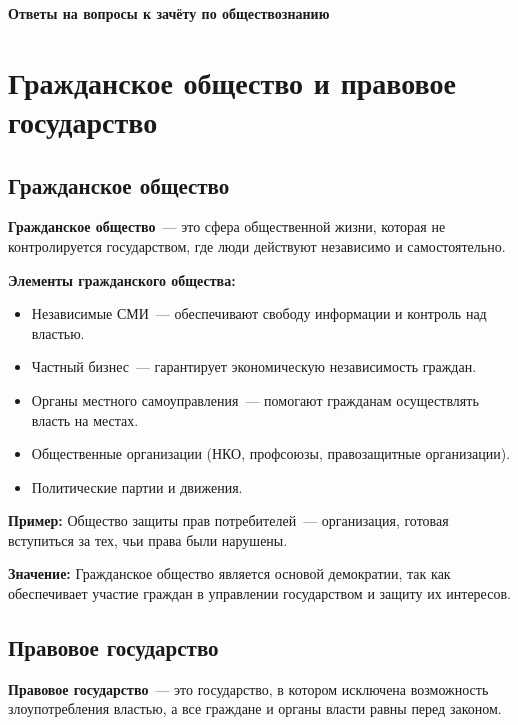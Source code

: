 \documentclass[12pt]{article}
\begin{document}
	\tableofcontents
	\setcounter{tocdepth}{4}
	\newpage
	
	\begin{center}
		\textbf{\Large Ответы на вопросы к зачёту по обществознанию}
	\end{center}
	
	\section{Гражданское общество и правовое государство}
	
	\subsection{Гражданское общество}
	
	\textbf{Гражданское общество}~--- это сфера общественной жизни, которая не контролируется государством, где люди действуют независимо и самостоятельно.
	
	\textbf{Элементы гражданского общества:}
	\begin{itemize}
		\item Независимые СМИ~--- обеспечивают свободу информации и контроль над властью.
		\item Частный бизнес~--- гарантирует экономическую независимость граждан.
		\item Органы местного самоуправления~--- помогают гражданам осуществлять власть на местах.
		\item Общественные организации (НКО, профсоюзы, правозащитные организации).
		\item Политические партии и движения.
	\end{itemize}
	
	\textbf{Пример:} Общество защиты прав потребителей~--- организация, готовая вступиться за тех, чьи права были нарушены.
	
	\textbf{Значение:} Гражданское общество является основой демократии, так как обеспечивает участие граждан в управлении государством и защиту их интересов.
	
	\subsection{Правовое государство}
	
	\textbf{Правовое государство}~--- это государство, в котором исключена возможность злоупотребления властью, а все граждане и органы власти равны перед законом.
	
\end{document}
